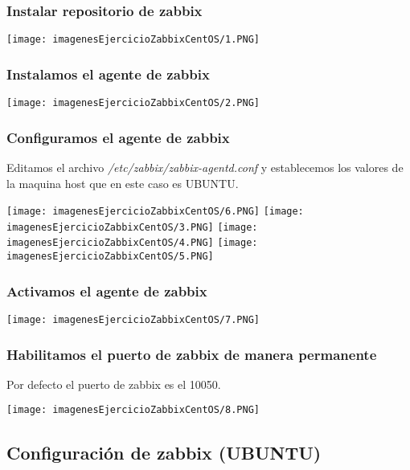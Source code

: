 \documentclass[a4paper, 12pt]{article}
\begin{document}
\subsubsection{Instalar repositorio de zabbix}
\texttt{[image: imagenesEjercicioZabbixCentOS/1.PNG]}
\subsubsection{Instalamos el agente de zabbix}
\texttt{[image: imagenesEjercicioZabbixCentOS/2.PNG]}
\subsubsection{Configuramos el agente de zabbix}
{Editamos el archivo \textit{/etc/zabbix/zabbix-agentd.conf} y establecemos los valores de la maquina host que en este caso es UBUNTU. \par}
\texttt{[image: imagenesEjercicioZabbixCentOS/6.PNG]}
\texttt{[image: imagenesEjercicioZabbixCentOS/3.PNG]}
\texttt{[image: imagenesEjercicioZabbixCentOS/4.PNG]}
\texttt{[image: imagenesEjercicioZabbixCentOS/5.PNG]}
\subsubsection{Activamos el agente de zabbix}
\texttt{[image: imagenesEjercicioZabbixCentOS/7.PNG]}
\subsubsection{Habilitamos el puerto de zabbix de manera permanente}
{Por defecto el puerto de zabbix es el 10050. \par}
\texttt{[image: imagenesEjercicioZabbixCentOS/8.PNG]}

\newpage

\subsection{Configuración de zabbix (UBUNTU)}
\end{document}

